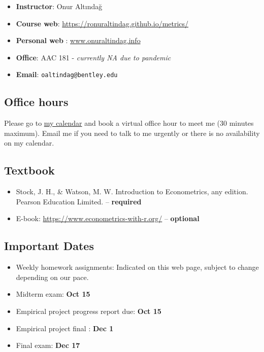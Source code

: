 \documentclass[
]{book}
\providecommand{\tightlist}{%
  \setlength{\itemsep}{0pt}\setlength{\parskip}{0pt}}
\begin{document}
\begin{itemize}
\tightlist
\item
  \textbf{Instructor}: Onur Altındağ
\item
  \textbf{Course web}: \url{https://ronuraltindag.github.io/metrics/}
\item
  \textbf{Personal web} : \href{https://www.onuraltindag.info/}{www.onuraltindag.info}
\item
  \textbf{Office}: AAC 181 - \emph{currently NA due to pandemic}
\item
  \textbf{Email}: \texttt{oaltindag@bentley.edu}
\end{itemize}

\hypertarget{office-hours}{%
\subsection*{Office hours}\label{office-hours}}

Please go to \href{https://calendly.com/ronuraltindag/ec282?month=2020-08}{my calendar} and book a virtual office hour to meet me (30 minutes maximum). Email me if you need to talk to me urgently or there is no availability on my calendar.

\hypertarget{textbook}{%
\subsection*{Textbook}\label{textbook}}

\begin{itemize}
\tightlist
\item
  Stock, J. H., \& Watson, M. W. Introduction to Econometrics, any edition. Pearson Education Limited. -- \textbf{required}
\item
  E-book: \url{https://www.econometrics-with-r.org/} -- \textbf{optional}
\end{itemize}

\hypertarget{important-dates}{%
\subsection*{Important Dates}\label{important-dates}}

\begin{itemize}
\tightlist
\item
  Weekly homework assignments: Indicated on this web page, subject to change depending on our pace.\\
\item
  Midterm exam: \textbf{Oct 15}
\item
  Empirical project progress report due: \textbf{Oct 15}
\item
  Empirical project final : \textbf{Dec 1}
\item
  Final exam: \textbf{Dec 17}
\end{itemize}
\end{document}
